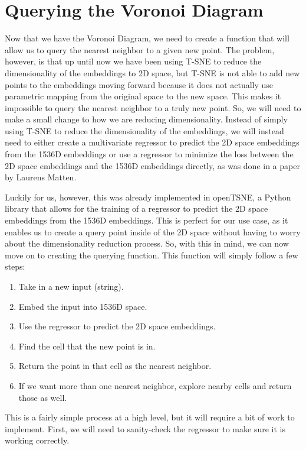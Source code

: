 \documentclass{article}
\begin{document}
\section{Querying the Voronoi Diagram}
Now that we have the Voronoi Diagram, we need to create a function
that will allow us to query the nearest neighbor to a given new point.
The problem, however, is that up until now we have been using T-SNE
to reduce the dimensionality of the embeddings to 2D space, but 
T-SNE is not able to add new points to the embeddings moving forward
because it does not actually use parametric mapping from the
original space to the new space. This makes it impossible to 
query the nearest neighbor to a truly new point. So, we will need to 
make a small change to how we are reducing dimensionality. Instead of
simply using T-SNE to reduce the dimensionality of the embeddings, we
will instead need to either create a multivariate regressor to predict
the 2D space embeddings from the 1536D embeddings or use a regressor to
minimize the loss between the 2D space embeddings and the 1536D embeddings
directly, as was done in a paper by Laurens Matten\cite{laurensMaaten2009}.
\newline

\noindent
Luckily for us, however, this was already implemented in openTSNE, a Python
library that allows for the training of a regressor to predict the 2D space
embeddings from the 1536D embeddings. This is perfect for our use case, as
it enables us to create a query point inside of the 2D space without having
to worry about the dimensionality reduction process. So, with this in mind,
we can now move on to creating the querying function. This function will
simply follow a few steps:

\begin{enumerate}
    \item Take in a new input (string).
    \item Embed the input into 1536D space.
    \item Use the regressor to predict the 2D space embeddings.
    \item Find the cell that the new point is in.
    \item Return the point in that cell as the nearest neighbor.
    \item If we want more than one nearest neighbor, explore nearby cells and return those as well.
\end{enumerate}

\noindent
This is a fairly simple process at a high level, but it will require a bit of work
to implement. First, we will need to sanity-check the regressor to make sure it is
working correctly.
\end{document}
